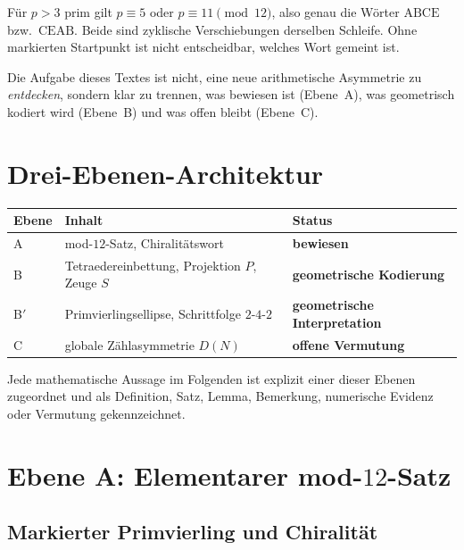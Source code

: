 \documentclass[11pt,a4paper]{article}
\theoremstyle{definition}
\theoremstyle{plain}
\begin{document}
	Für $p>3$ prim gilt $p\equiv 5$ oder $p\equiv 11\pmod{12}$, also genau die Wörter $\mathrm{ABCE}$ bzw.\ $\mathrm{CEAB}$. Beide sind zyklische Verschiebungen derselben Schleife. Ohne markierten Startpunkt ist nicht entscheidbar, welches Wort gemeint ist.
	
	Die Aufgabe dieses Textes ist nicht, eine neue arithmetische Asymmetrie zu \emph{entdecken}, sondern klar zu trennen, was bewiesen ist (Ebene~A), was geometrisch kodiert wird (Ebene~B) und was offen bleibt (Ebene~C).
	
	\section{Drei-Ebenen-Architektur}
	
	\begin{center}
		\begin{tabular}{@{}lll@{}}
			\toprule
			Ebene & Inhalt & Status \\
			\midrule
			A & mod-$12$-Satz, Chiralitätswort & \textbf{bewiesen} \\
			B & Tetraedereinbettung, Projektion $P$, Zeuge $S$ & \textbf{geometrische Kodierung} \\
			B$'$ & Primvierlingsellipse, Schrittfolge $2$-$4$-$2$ & \textbf{geometrische Interpretation} \\
			C & globale Zählasymmetrie $D(N)$ & \textbf{offene Vermutung} \\
			\bottomrule
		\end{tabular}
	\end{center}
	
	Jede mathematische Aussage im Folgenden ist explizit einer dieser Ebenen zugeordnet und als Definition, Satz, Lemma, Bemerkung, numerische Evidenz oder Vermutung gekennzeichnet.
	
	\section{Ebene A: Elementarer mod-$12$-Satz}
	
	\subsection{Markierter Primvierling und Chiralität}
	
\end{document}
